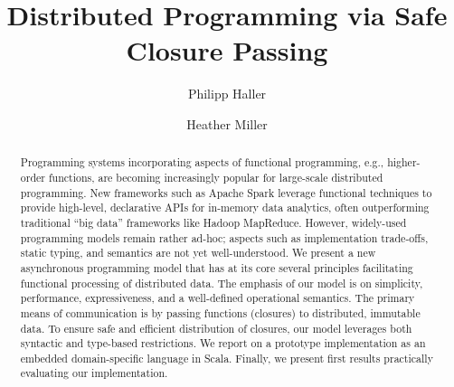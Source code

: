 \documentclass{easychair}
\begin{document}
\title{Distributed Programming via Safe Closure Passing}



%
\author{
  Philipp Haller
\and
  Heather Miller
}




\maketitle

\begin{abstract}

Programming systems incorporating aspects of functional programming, e.g.,
higher-order functions, are becoming increasingly popular for large-scale
distributed programming. New frameworks such as Apache Spark leverage
functional techniques to provide high-level, declarative APIs for in-memory
data analytics, often outperforming traditional ``big data'' frameworks like
Hadoop MapReduce. However, widely-used programming models remain rather
ad-hoc; aspects such as implementation trade-offs, static typing, and semantics
are not yet well-understood. We present a new asynchronous programming model
that has at its core several principles facilitating functional processing of
distributed data. The emphasis of our model is on simplicity, performance,
expressiveness, and a well-defined operational semantics. The primary means of
communication is by passing functions (closures) to distributed, immutable
data. To ensure safe and efficient distribution of closures, our model
leverages both syntactic and type-based restrictions. We report on a prototype
implementation as an embedded domain-specific language in Scala. Finally, we
present first results practically evaluating our implementation.

\end{abstract}
\end{document}
